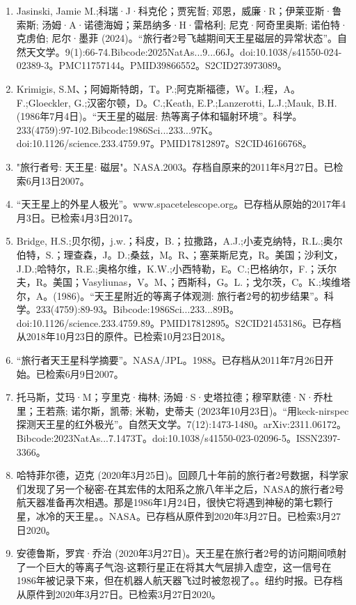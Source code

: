 \begin{enumerate}
\item Jasinski, Jamie M.;科瑞·J·科克伦；贾宪哲; 邓恩，威廉·R；伊莱亚斯·鲁索斯; 汤姆·A·诺德海姆；莱昂纳多·H·雷格利; 尼克·阿奇里奥斯; 诺伯特·克虏伯; 尼尔·墨菲 (2024)。“旅行者2号飞越期间天王星磁层的异常状态”。自然天文学。9(1):66-74.Bibcode:2025NatAs...9...66J。doi:10.1038/s41550-024-02389-3。PMC11757144。PMID39866552。S2CID273973089。   
\item Krimigis, S.M、；阿姆斯特朗，T。P.;阿克斯福德，W。I.;程，A。F.;Gloeckler, G.;汉密尔顿，D。C.;Keath, E.P.;Lanzerotti, L.J.;Mauk, B.H. (1986年7月4日)。“天王星的磁层: 热等离子体和辐射环境”。科学。233(4759):97-102.Bibcode:1986Sci...233...97K。doi:10.1126/science.233.4759.97。PMID17812897。S2CID46166768。   
\item "旅行者号: 天王星: 磁层"。NASA.2003。存档自原来的2011年8月27日。已检索6月13日2007。
\item “天王星上的外星人极光”。www.spacetelescope.org。已存档从原始的2017年4月3日。已检索4月3日2017。
\item Bridge, H.S.;贝尔彻，j.w.；科皮，B.；拉撒路，A.J.;小麦克纳特，R.L.;奥尔伯特，S.；理查森，J。D.;桑兹，M。R、；塞莱斯尼克，R。美国；沙利文，J.D.;哈特尔，R.E.;奥格尔维，K.W.;小西特勒，E。C.;巴格纳尔，F.；沃尔夫，R。美国；Vasyliunas，V。M、；西斯科，G。L.；戈尔茨，C。K.;埃维塔尔，A。(1986)。“天王星附近的等离子体观测: 旅行者2号的初步结果”。科学。233(4759):89-93。Bibcode:1986Sci...233...89B。doi:10.1126/science.233.4759.89。PMID17812895。S2CID21453186。已存档从2018年10月23日的原件。已检索10月23日2018。  
\item “旅行者天王星科学摘要”。NASA/JPL。1988。已存档从2011年7月26日开始。已检索6月9日2007。
\item 托马斯，艾玛·M；亨里克·梅林; 汤姆·S·史塔拉德；穆罕默德·N·乔杜里；王若燕; 诺尔斯，凯蒂; 米勒，史蒂夫 (2023年10月23日)。“用keck-nirspec探测天王星的红外极光”。自然天文学。7(12):1473-1480。arXiv:2311.06172。Bibcode:2023NatAs...7.1473T。doi:10.1038/s41550-023-02096-5。ISSN2397-3366。 
\item 哈特菲尔德，迈克 (2020年3月25日)。回顾几十年前的旅行者2号数据，科学家们发现了另一个秘密-在其宏伟的太阳系之旅八年半之后，NASA的旅行者2号航天器准备再次相遇。那是1986年1月24日，很快它将遇到神秘的第七颗行星，冰冷的天王星。。NASA。已存档从原件到2020年3月27日。已检索3月27日2020。
\item 安德鲁斯，罗宾·乔治 (2020年3月27日)。天王星在旅行者2号的访问期间喷射了一个巨大的等离子气泡-这颗行星正在将其大气层排入虚空，这一信号在1986年被记录下来，但在机器人航天器飞过时被忽视了。。纽约时报。已存档从原件到2020年3月27日。已检索3月27日2020。

\end{enumerate}
